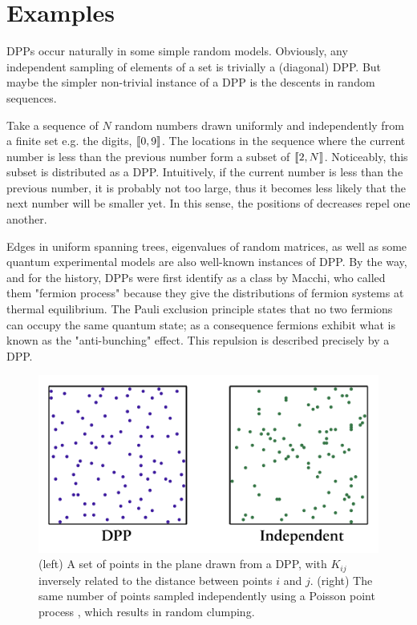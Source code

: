\section{Examples}

DPPs occur naturally in some simple random models. Obviously, any independent sampling of elements of a set is trivially a (diagonal) DPP. But maybe the simpler non-trivial instance of a DPP is the descents in random sequences.


Take a sequence of $N$ random numbers drawn uniformly and independently from a finite set e.g. the digits, $\llbracket 0,9 \rrbracket$. The locations in the sequence where the current number is less than the previous number form a subset of  $\llbracket 2,N \rrbracket$. Noticeably, this subset is distributed as a DPP. Intuitively, if the current number is less than the previous number, it is probably not too large, thus it becomes less likely that the next number will be smaller yet. In this sense, the positions of decreases repel one another.

Edges in uniform spanning trees, eigenvalues of random matrices, as well as some quantum experimental models are also well-known instances of DPP. By the way, and for the history, DPPs were first identify as a class by Macchi, who called them "fermion process" because they give the distributions of fermion systems at thermal equilibrium. The Pauli exclusion principle states that no two fermions can occupy the same quantum state; as a consequence fermions exhibit what is known as the "anti-bunching" effect. This repulsion is described precisely by a DPP.

\begin{figure}[!ht]
    \centering
    \includegraphics[width=0.6\linewidth]{pics/dpp_vs_iid.png}
    \caption{(left) A set of points in the plane drawn from a DPP, with $K_{i j}$ inversely related to the distance between points $i$ and $j$. (right) The same number of points sampled independently using a Poisson point process , which results in random clumping.}
    \label{fig_dpp_vs_iid}
\end{figure}



